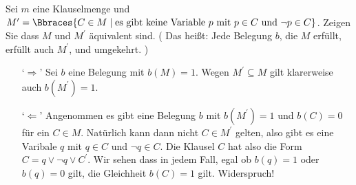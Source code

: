 
\begin{exercise}[45]

Sei $m$ eine Klauselmenge und $M^\prime = \Bbraces{C \in M \mid \text{es gibt keine Variable}~ p ~\text{mit}~ p \in C ~\text{und}~ \neg p \in C}$.
Zeigen Sie dass $M$ und $M^\prime$ äquivalent sind.
(
    Das heißt:
    Jede Belegung $b$, die $M$ erfüllt, erfüllt auch $M^\prime$, und umgekehrt.
)

\end{exercise}


\begin{solution}
\phantom{}
\begin{enumerate}
	\item[`$\Rightarrow$'] Sei $b$ eine Belegung mit $b(M) = 1$. Wegen $M^\prime \subseteq M$ gilt klarerweise auch $b(M^\prime) = 1$.
	\item[`$\Leftarrow$'] Angenommen es gibt eine Belegung $b$ mit $b(M^\prime) = 1$ und $b(C) = 0$ für ein $C \in M$. Natürlich kann dann nicht $C \in M^\prime$ gelten, also gibt es eine Varibale $q$ mit $q \in C$ und $\neg q \in C$. Die Klausel $C$ hat also die Form $ C = q \lor \neg q \lor C^\prime$. Wir sehen dass in jedem Fall, egal ob $b(q) = 1$ oder $b(q) = 0$ gilt, die Gleichheit $b(C) = 1$ gilt. Widerspruch!
\end{enumerate}
\end{solution}

